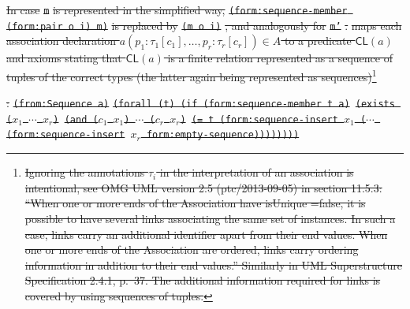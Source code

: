 \documentclass[10pt,fleqn,final]{scrreprt}
\newcommand*{\CL}{\ensuremath{\mathsf{CL}}\xspace}
\newcommand{\white}[1]{{\color{white}{#1}}}
\newcommand{\qqquad}{\white{x}\qquad}
\providecommand{\DIFdel}[1]{{\protect\color{red}\sout{#1}}}                      %
\providecommand{\DIFdelbegin}{} %
\providecommand{\DIFdelend}{} %
\begin{document}
\begin{itemize}[topsep=0pt, label=--, leftmargin=*]
{\DIFdelbegin \DIFdel{In case }\texttt{\DIFdel{m}} %
\DIFdel{is represented in the simplified way, }\texttt{\DIFdel{(form:sequence-member (form:pair o i) m)}} %
\DIFdel{is replaced by }\texttt{\DIFdel{(m o i)}}%
\DIFdel{, and analogously for }\texttt{\DIFdel{m'}}%
\DIFdel{.
  }%
\DIFdel{maps each association declaration $a(p_1 : \tau_1[c_1], \ldots, p_r : \tau_r[c_r])\in A$ to a predicate $\CL(a)$ and axioms stating that $\CL(a)$ is a finite relation represented as a sequence of tuples of the correct types (the latter again
being represented as sequences)}\footnote{\DIFdel{Ignoring the annotations $\tau_i$ in the interpretation of an association is intentional, see OMG UML version 2.5 (ptc/2013-09-05) in section 11.5.3: ``When one or more ends of the Association have isUnique =false, it is possible to have several links associating the same set of
instances. In such a case, links carry an additional identifier apart from their end values.
When one or more ends of the Association are ordered, links carry ordering information in addition to their end values.'' Similarly in UML Superstructure Specification 2.4.1, p.~37.  The additional information required for links is covered by using sequences of tuples.}}%
\addtocounter{footnote}{-1}%
\DIFdel{:}%
\texttt{\DIFdel{(from:Sequence a)}}%
\texttt{\DIFdel{(forall (t) (if (form:sequence-member t a)}%
\DIFdel{(exists ($x_1$ $\cdots$ $x_r$)}%
\DIFdel{(and ($c_1$ $x_1$) $\cdots$ ($c_r$ $x_r$)}%
\DIFdel{(= t (form:sequence-insert $x_1$ ($\cdots$ (form:sequence-insert}%
\DIFdel{$x_r$ form:empty-sequence))))))))}}
\DIFdelend 

}
\end{itemize}
\end{document}
